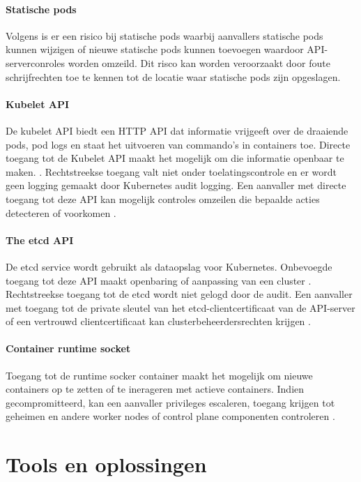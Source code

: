 \paragraph{Statische pods}
Volgens \textcite{KubernetesDocs-2023} is er een risico bij statische pods waarbij aanvallers statische pods kunnen wijzigen of nieuwe statische pods kunnen toevoegen waardoor API-serverconroles worden omzeild. 
Dit risco kan worden veroorzaakt door foute schrijfrechten toe te kennen tot de locatie waar statische pods zijn opgeslagen.

\paragraph{Kubelet API}
De kubelet API biedt een HTTP API dat informatie vrijgeeft over de draaiende pods, pod logs en staat het uitvoeren van commando's in containers toe.
Directe toegang tot de Kubelet API maakt het mogelijk om die informatie openbaar te maken. \autocite{KubernetesDocs-2023}.
Rechtstreekse toegang valt niet onder toelatingscontrole en er wordt geen logging gemaakt door Kubernetes audit logging. Een aanvaller met directe toegang tot deze API kan mogelijk controles omzeilen die bepaalde acties detecteren of voorkomen \autocite{KubernetesDocs-2023}.

\paragraph{The etcd API}
De etcd service wordt gebruikt als dataopslag voor Kubernetes. Onbevoegde toegang tot deze API maakt openbaring of aanpassing van een cluster \autocite{KubernetesDocs-2023}. Rechtstreekse toegang tot de etcd wordt niet gelogd door de audit.
Een aanvaller met toegang tot de private sleutel van het etcd-clientcertificaat van de API-server of een vertrouwd clientcertificaat kan clusterbeheerdersrechten krijgen \autocite{KubernetesDocs-2023}.

\paragraph{Container runtime socket}
Toegang tot de runtime socker container maakt het mogelijk om nieuwe containers op te zetten of te inerageren met actieve containers. Indien gecompromitteerd, kan een aanvaller privileges escaleren, toegang krijgen tot geheimen en andere worker nodes of control plane componenten controleren \autocite{KubernetesDocs-2023}.

\section{Tools en oplossingen}

